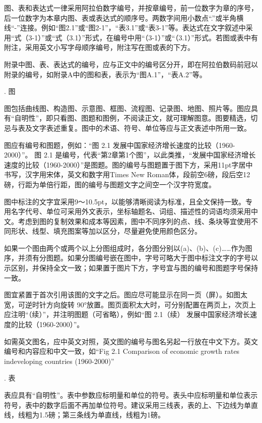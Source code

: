 \documentclass{Diploma}
\begin{document}
\begin{}
图、表和表达式一律采用阿拉伯数字编号，并按章编号，前一位数字为章的序号，后一位数字为本章内图、表或表达式的顺序号。两数字间用小数点“.”或半角横线“-”连接。例如“图2.1”或“图2-1”，“表3.1”或“表3-1”等。表达式在文字叙述中采用“式（3-1）”或“式（3.1）”形式，在编号中用“（3-1）”或“（3.1）”形式。若图或表中有附注，采用英文小写字母顺序编号，附注写在图或表的下方。

附录中图、表、表达式的编号，应与正文中的编号区分开，即在阿拉伯数码前冠以附录的编号，如附录A中的图和表，表示为“图A.1”，“表A.2”等。

. 图

图包括曲线图、构造图、示意图、框图、流程图、记录图、地图、照片等。图应具有“自明性”，即只看图、图题和图例，不阅读正文，就可理解图意。图要精选，切忌与表及文字表述重复。图中的术语、符号、单位等应与正文表述中所用一致。

图应有编号和图题，例如：“图 2.1 发展中国家经济增长速度的比较（1960-2000）”。 图 2.1 是编号，代表“第2章第1个图”，以此类推，“发展中国家经济增长速度的比较（1960-2000）”是图题。图的编号与图题置于图下方，采用11pt字居中书写，汉字用宋体，英文和数字用Times New Roman体，段前空6磅，段后空12磅，行距为单倍行距，图的编号与图题文字之间空一个汉字符宽度。

图中标注的文字宜采用9～10.5pt，以能够清晰阅读为标准，且全文保持一致。专用名字代号、单位可采用外文表示，坐标轴题名、词组、描述性的词语均须采用中文。考虑到图的复制效果和成本等因素，图中不同序列的点、线、条块等宜使用不同形状、线型、填充图案等加以区分，尽量避免使用颜色区分。

如果一个图由两个或两个以上分图组成时，各分图分别以(a)、(b)、(c)……作为图序，并须有分图题。如果分图编号嵌在图中，字号可略大于图中标注文字的字号以示区别，并保持全文一致；如果置于图片下方，字号宜与图的编号和图题字号保持一致。

图宜紧置于首次引用该图的文字之后。图应尽可能显示在同一页（屏）。如图太宽，可逆时针方向旋转 90°放置。图页面积太大时，可分别配置在两页上，次页上应注明“（续）”，并注明图题（可省略），例如“图 2.1（续） 发展中国家经济增长速度的比较（1960-2000）”。

如需英文图名，应中英文对照，英文图的编号与图名另起一行放在中文下方。英文编号和内容应和中文一致，如“Fig 2.1 Comparison of economic growth rates indeveloping countries (1960-2000)”

. 表

表应具有“自明性”。表中参数应标明量和单位的符号。表头中应标明量和单位表示符号，表中的数字后面不再加单位符号。建议采用三线表，表的上、下边线为单直线，线粗为1.5磅；第三条线为单直线，线粗为1磅。


\end{}
\end{document}
